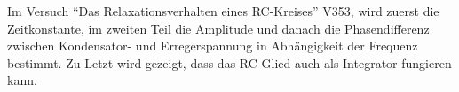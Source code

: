 Im Versuch \enquote{Das Relaxationsverhalten eines RC-Kreises} V353, wird zuerst die Zeitkonstante, im zweiten Teil die Amplitude und danach die Phasendifferenz zwischen Kondensator- und Erregerspannung in Abhängigkeit der
Frequenz bestimmt.
Zu Letzt wird gezeigt, dass das RC-Glied auch als Integrator fungieren kann.

